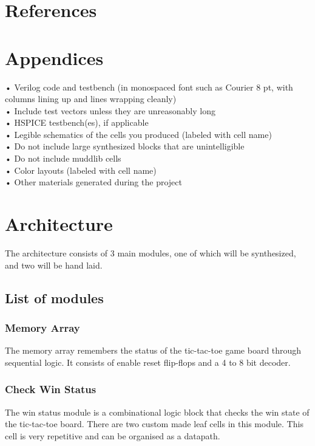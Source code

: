 \documentclass[]{article}
\begin{document}
\section{References}
\section{Appendices}
• Verilog code and testbench (in monospaced font such as Courier 8 pt, with columns lining up and lines wrapping cleanly)\\
• Include test vectors unless they are unreasonably long\\
• HSPICE testbench(es), if applicable\\
• Legible schematics of the cells you produced (labeled with cell name)\\
• Do not include large synthesized blocks that are unintelligible\\
• Do not include muddlib cells\\
• Color layouts (labeled with cell name)\\
• Other materials generated during the project 








\section{Architecture}
The architecture consists of 3 main modules, one of which will be synthesized, and two will be hand laid.

\subsection{List of modules}
\subsubsection{Memory Array}
The memory array remembers the status of the tic-tac-toe game board through sequential logic. It consists of enable reset flip-flops and a 4 to 8 bit decoder.
\subsubsection{Check Win Status}
The win status module is a combinational logic block that checks the win state of the tic-tac-toe board. There are two custom made leaf cells in this module. This cell is very repetitive and can be organised as a datapath.
\end{document}

